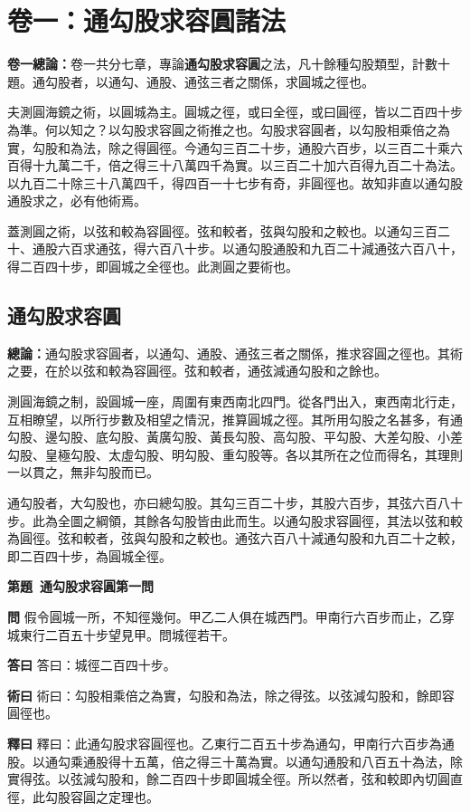 \documentclass[11pt,a4paper]{article}
\newcommand{\wen}[1]{\noindent\textbf{問} #1\par}
\newcommand{\da}[1]{\noindent\textbf{答曰} #1\par}
\newcommand{\shu}[1]{\noindent\textbf{術曰} #1\par}
\newcommand{\shi}[1]{\noindent\textbf{釋曰} #1\par}
\newcounter{problem}[section]
\newenvironment{problem}[1][]{%
  \refstepcounter{problem}%
  \medskip\noindent\textbf{第\theproblem 題#1}\quad
}{\medskip}
\begin{document}
\section{卷一：通勾股求容圓諸法}

\noindent
\textbf{卷一總論：}卷一共分七章，專論\textbf{通勾股求容圓}之法，凡十餘種勾股類型，計數十題。通勾股者，以通勾、通股、通弦三者之關係，求圓城之徑也。

夫測圓海鏡之術，以圓城為主。圓城之徑，或曰全徑，或曰圓徑，皆以二百四十步為準。何以知之？以勾股求容圓之術推之也。勾股求容圓者，以勾股相乘倍之為實，勾股和為法，除之得圓徑。今通勾三百二十步，通股六百步，以三百二十乘六百得十九萬二千，倍之得三十八萬四千為實。以三百二十加六百得九百二十為法。以九百二十除三十八萬四千，得四百一十七步有奇，非圓徑也。故知非直以通勾股通股求之，必有他術焉。

蓋測圓之術，以弦和較為容圓徑。弦和較者，弦與勾股和之較也。以通勾三百二十、通股六百求通弦，得六百八十步。以通勾股通股和九百二十減通弦六百八十，得二百四十步，即圓城之全徑也。此測圓之要術也。

\bigskip

\subsection{通勾股求容圓}
\noindent
\textbf{總論：}通勾股求容圓者，以通勾、通股、通弦三者之關係，推求容圓之徑也。其術之要，在於以弦和較為容圓徑。弦和較者，通弦減通勾股和之餘也。

測圓海鏡之制，設圓城一座，周圍有東西南北四門。從各門出入，東西南北行走，互相瞭望，以所行步數及相望之情況，推算圓城之徑。其所用勾股之名甚多，有通勾股、邊勾股、底勾股、黃廣勾股、黃長勾股、高勾股、平勾股、大差勾股、小差勾股、皇極勾股、太虛勾股、明勾股、重勾股等。各以其所在之位而得名，其理則一以貫之，無非勾股而已。

通勾股者，大勾股也，亦曰總勾股。其勾三百二十步，其股六百步，其弦六百八十步。此為全圖之綱領，其餘各勾股皆由此而生。以通勾股求容圓徑，其法以弦和較為圓徑。弦和較者，弦與勾股和之較也。通弦六百八十減通勾股和九百二十之較，即二百四十步，為圓城全徑。

\bigskip

\begin{problem}[\ 通勾股求容圓第一問]
\wen{假令圓城一所，不知徑幾何。甲乙二人俱在城西門。甲南行六百步而止，乙穿城東行二百五十步望見甲。問城徑若干。}
\da{答曰：城徑二百四十步。}
\shu{術曰：勾股相乘倍之為實，勾股和為法，除之得弦。以弦減勾股和，餘即容圓徑也。}
\shi{釋曰：此通勾股求容圓徑也。乙東行二百五十步為通勾，甲南行六百步為通股。以通勾乘通股得十五萬，倍之得三十萬為實。以通勾通股和八百五十為法，除實得弦。以弦減勾股和，餘二百四十步即圓城全徑。所以然者，弦和較即內切圓直徑，此勾股容圓之定理也。}
\end{problem}
\end{document}
